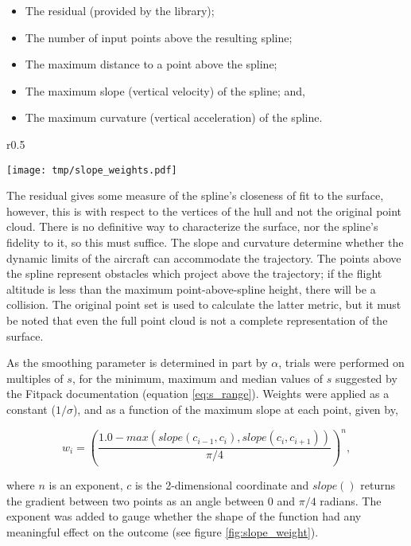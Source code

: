 \documentclass[doc]{apa6}
\begin{document}
\begin{itemize}
\item The residual (provided by the library);
\item The number of input points above the resulting spline;
\item The maximum distance to a point above the spline;
\item The maximum slope (vertical velocity) of the spline; and,
\item The maximum curvature (vertical acceleration) of the spline.
\end{itemize}

\begin{wrapfigure}{r}{0.5\textwidth} %
\begin{center}
\texttt{[image: tmp/slope\_weights.pdf]} 
\end{center}
\caption{Effect of the exponent on the slope- or angle-weight multiplier.}
\label{fig:slope_weight}
\end{wrapfigure}

The residual gives some measure of the spline's closeness of fit to the surface, however, this is with respect to the vertices of the hull and not the original point cloud. There is no definitive way to characterize the surface, nor the spline's fidelity to it, so this must suffice. The slope and curvature determine whether the dynamic limits of the aircraft can accommodate the trajectory. The points above the spline represent obstacles which project above the trajectory; if the flight altitude is less than the maximum point-above-spline height, there will be a collision. The original point set is used to calculate the latter metric, but it must be noted that even the full point cloud is not a complete representation of the surface.

As the smoothing parameter is determined in part by $\alpha$, trials were performed on multiples of $s$, for the minimum, maximum and median values of $s$ suggested by the Fitpack documentation (equation \ref{eq:s_range}). Weights were applied as a constant ($1/\sigma$), and as a function of the maximum slope at each point, given by,

\begin{equation}\label{eq:weights}
w_i = \left(
	\frac{
		1.0 - max(slope(c_{i-1}, c_i), slope(c_i, c_{i+1}))
	}
	{\pi/4}
	\right)^n,
\end{equation}

where $n$ is an exponent, $c$ is the 2-dimensional coordinate and $slope()$ returns the gradient between two points as an angle between $0$ and $\pi/4$ radians. The exponent was added to gauge whether the shape of the function had any meaningful effect on the outcome (see figure \ref{fig:slope_weight}).
\end{document}
